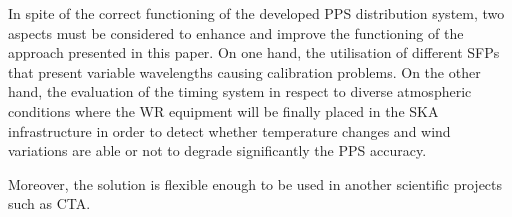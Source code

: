 In spite of the correct functioning of the developed PPS distribution system, 
two aspects must be considered to enhance and improve the functioning of the approach presented in this paper. 
On one hand, the utilisation of different SFPs that present variable wavelengths causing calibration problems.
On the other hand, the evaluation of the timing system in respect to diverse atmospheric
conditions where the WR equipment will be finally placed in the SKA infrastructure in order to detect whether
temperature changes and wind variations are able or not to degrade significantly the PPS accuracy.

Moreover, the solution is flexible enough to be used in another scientific
projects such as CTA.  

